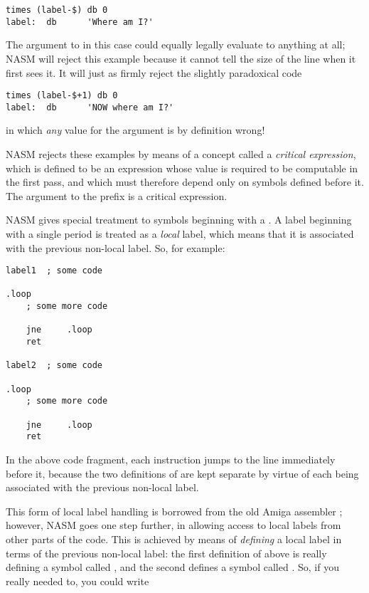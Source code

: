 \begin{lstlisting}
times (label-$) db 0
label:	db      'Where am I?'
\end{lstlisting}

The argument to  in this case could equally legally
evaluate to anything at all; NASM will reject this example because
it cannot tell the size of the  line when it first sees it.
It will just as firmly reject the slightly paradoxical
code

\begin{lstlisting}
times (label-$+1) db 0
label:  db      'NOW where am I?'
\end{lstlisting}

in which \emph{any} value for the  argument
is by definition wrong!

NASM rejects these examples by means of a concept called a
\emph{critical expression}, which is defined to be an
expression whose value is required to be computable in
the first pass, and which must therefore depend only
on symbols defined before it. The argument to the 
prefix is a critical expression.


NASM gives special treatment to symbols beginning with a .
A label beginning with a single period is treated as a \emph{local}
label, which means that it is associated with the previous non-local
label. So, for example:

\begin{lstlisting}
label1  ; some code

.loop
    ; some more code

    jne     .loop
    ret

label2  ; some code

.loop
    ; some more code

    jne     .loop
    ret
\end{lstlisting}

In the above code fragment, each  instruction jumps to the
line immediately before it, because the two definitions of
 are kept separate by virtue of each being associated
with the previous non-local label.

This form of local label handling is borrowed from the old Amiga
assembler ; however, NASM goes one step further,
in allowing access to local labels from other parts of the code. This
is achieved by means of \emph{defining} a local label in terms of the
previous non-local label: the first definition of  above is
really defining a symbol called , and the second
defines a symbol called . So, if you really needed
to, you could write

